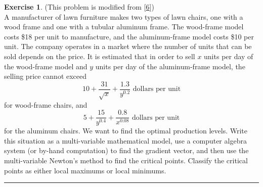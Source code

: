 \documentclass[
]{book}
\theoremstyle{definition}
\theoremstyle{definition}
\theoremstyle{definition}
\newtheorem{exercise}{Exercise}[chapter]
\theoremstyle{remark}
\begin{document}
\begin{exercise}
\protect\hypertarget{exr:unnamed-chunk-862}{}{\label{exr:unnamed-chunk-862} }(This problem is modified from {[}\protect\hyperlink{ref-meerschaert}{6}{]})\\
A manufacturer of lawn furniture makes two types of lawn chairs, one
with a wood frame and one with a tubular aluminum frame. The wood-frame
model costs \$18 per unit to manufacture, and the aluminum-frame model
costs \$10 per unit. The company operates in a market where the number
of units that can be sold depends on the price. It is estimated that in
order to sell \(x\) units per day of the wood-frame model and \(y\) units
per day of the aluminum-frame model, the selling price cannot exceed
\[10 + \frac{31}{\sqrt{x}} + \frac{1.3}{y^{0.2}} \text{ dollars per unit}\]
for wood-frame chairs, and
\[5 + \frac{15}{y^{0.4}} + \frac{0.8}{x^{0.08}} \text{ dollars per unit}\]
for the aluminum chairs. We want to find the optimal production levels.
Write this situation as a multi-variable mathematical model, use a
computer algebra system (or by-hand computation) to find the gradient
vector, and then use the multi-variable Newton's method to find the
critical points. Classify the critical points as either local maximums
or local minimums.
\end{exercise}

\begin{center}\rule{0.5\linewidth}{0.5pt}\end{center}
\end{document}
